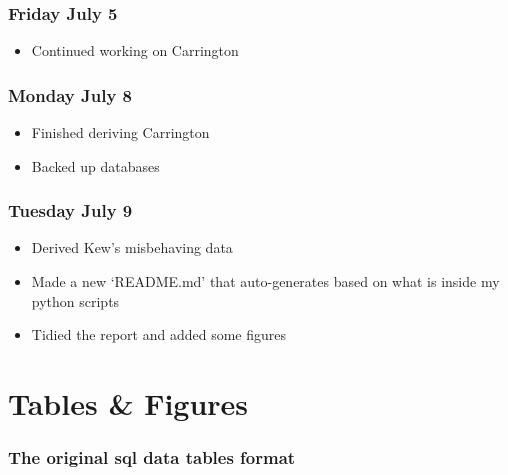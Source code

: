\documentclass[12pt]{article}
\begin{document}
\subsubsection{Friday July 5}
\begin{itemize}
    \item Continued working on Carrington
\end{itemize}

\subsubsection{Monday July 8}
\begin{itemize}
    \item Finished deriving Carrington
    \item Backed up databases
\end{itemize}

\subsubsection{Tuesday July 9}
\begin{itemize}
    \item Derived Kew's misbehaving data
    \item Made a new `README.md' that auto-generates based on what is inside my python scripts
    \item Tidied the report and added some figures
\end{itemize}



\section{Tables & Figures}

\subsubsection{The original sql data tables format}
\end{document}
